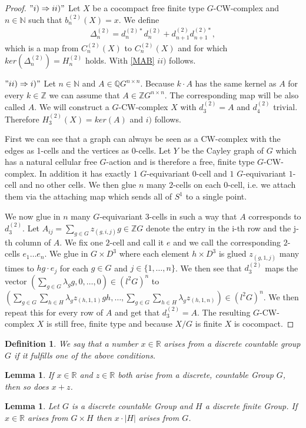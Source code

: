\documentclass[12pt,a4paper]{scrartcl}
\newtheorem{Definition}[Theorem]{Definition}
\newtheorem{Lemma}[Theorem]{Lemma}
\numberwithin{equation}{section}
\newcommand{\R}{\mathbb{R}} %
\newcommand{\Q}{\mathbb{Q}} %
\newcommand{\Z}{\mathbb{Z}} %
\newcommand{\N}{\mathbb{N}} %
\newcommand{\2}{\mathbb{Z} / 2 \mathbb{Z}}
\newcommand{\1}{\overline{1}}
\newcommand{\0}{\overline{0}}
\begin{document}
\begin{proof}
	$"i) \Rightarrow ii)"$ Let $X$ be a cocompact free finite type $G$-CW-complex and $n \in \N$ such that $b_n^{(2)}(X)=x$. We define 
	\begin{align*}
		\Delta_n^{(2)} = d_n^{(2)*} d_n^{(2)} + d_{n+1}^{(2)} d_{n+1}^{(2)*},
	\end{align*}
	which is a map from $C_n^{(2)}(X)$ to $C_n^{(2)}(X)$ and for which $ker(\Delta_n^{(2)}) = H_n^{(2)}$ holds. With \ref{MAB} $ii)$ follows. 
	
	$"ii) \Rightarrow i)"$ Let $n \in \N$ and $A\in \Q G^{n \times n}$. Because $k \cdot A$ has the same kernel as $A$ for every $k \in \Z$ we can assume that $A \in \Z G^{n \times n}$. The corresponding map will be also called $A$. We will construct a $G$-CW-complex $X$ with $d_3^{(2)} = A$ and $d_4^{(2)}$ trivial. Therefore $H_3^{(2)}(X) = ker(A)$ and $i)$ follows.
	
	First we can see that a graph can always be seen as a CW-complex with the edges as 1-cells and the vertices as 0-cells. Let $Y$ be the Cayley graph of $G$ which has a natural cellular free $G$-action and is therefore a free, finite type $G$-CW-complex. In addition it has exactly $1$ $G$-equivariant $0$-cell and $1$ $G$-equivariant $1$-cell and no other cells. We then glue $n$ many $2$-cells on each $0$-cell, i.e. we attach them via the attaching map which sends all of $S^1$ to a single point. 
	
	We now glue in $n$ many $G$-equivariant $3$-cells in such a way that $A$ corresponds to $d_3^{(2)}$. Let $A_{ij} = \sum_{g \in G} z_{(g, i, j)} g \in \Z G$ denote the entry in the i-th row and the j-th column of $A$. We fix one $2$-cell and call it $e$ and we call the corresponding $2$-cells $e_1 \ldots e_n$. We glue in $G \times D^3$ where each element $h \times D^3$ is glued $z_{(g, 1, j)}$ many times to $h g \cdot e_j$ for each $g \in G$ and $j \in \{1, \ldots, n\}$. We then see that $d_3^{(2)}$ maps the vector $(\sum_{g \in G} \lambda_g g, 0 , \ldots , 0) \in (l^2 G)^n$ to $(\sum_{g \in G} \sum_{h \in H} \lambda_g z_{(h, 1, 1)} g h, \ldots , \sum_{g \in G} \sum_{h \in H} \lambda_g z_{(h, 1, n)}) \in (l^2 G)^n$. We then repeat this for every row of $A$ and get that $d_3^{(2)} = A$. The resulting $G$-CW-complex $X$ is still free, finite type and because $X/G$ is finite $X$ is cocompact.
\end{proof}
\begin{Definition}
	We say that a number $x \in \R$ arises from a discrete countable group $G$ if it fulfills one of the above conditions.
\end{Definition}
\begin{Lemma}\label{add}
	If $x \in \R$ and $z \in \R$ both arise from a discrete, countable Group $G$, then so does $x + z$.
\end{Lemma}
\begin{Lemma}\label{mult}
	Let $G$ is a discrete countable Group and $H$ a discrete finite Group. If $x \in \R$ arises from $G \times H$ then $x \cdot |H|$ arises from $G$.
\end{Lemma}
\end{document}
